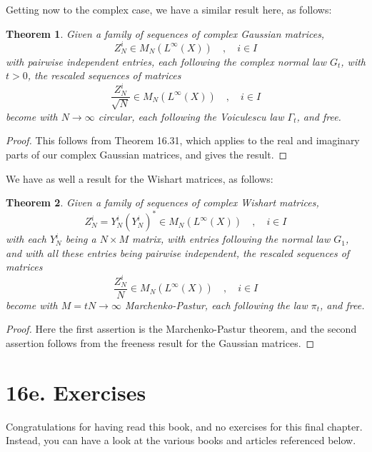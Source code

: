 \documentclass[12pt]{amsbook}
\newtheorem{theorem}{Theorem}[chapter]
\begin{document}
Getting now to the complex case, we have a similar result here, as follows:


\begin{theorem}
Given a family of sequences of complex Gaussian matrices, 
$$Z^i_N\in M_N(L^\infty(X))\quad,\quad i\in I$$
with pairwise independent entries, each following the complex normal law $G_t$, with $t>0$, the rescaled sequences of matrices
$$\frac{Z^i_N}{\sqrt{N}}\in M_N(L^\infty(X))\quad,\quad i\in I$$
become with $N\to\infty$ circular, each following the Voiculescu law $\Gamma_t$, and free.
\end{theorem}

\begin{proof}
This follows from Theorem 16.31, which applies to the real and imaginary parts of our complex Gaussian matrices, and gives the result.
\end{proof}

We have as well a result for the Wishart matrices, as follows:

\begin{theorem}
Given a family of sequences of complex Wishart matrices, 
$$Z^i_N=Y^i_N(Y^i_N)^*\in M_N(L^\infty(X))\quad,\quad i\in I$$
with each $Y^i_N$ being a $N\times M$ matrix, with entries following the normal law $G_1$, and with all these entries being pairwise independent, the rescaled sequences of matrices
$$\frac{Z^i_N}{N}\in M_N(L^\infty(X))\quad,\quad i\in I$$
become with $M=tN\to\infty$ Marchenko-Pastur, each following the law $\pi_t$, and free.
\end{theorem}

\begin{proof}
Here the first assertion is the Marchenko-Pastur theorem, and the second assertion follows from the freeness result for the Gaussian matrices.
\end{proof}

\section*{16e. Exercises}

Congratulations for having read this book, and no exercises for this final chapter. Instead, you can have a look at the various books and articles referenced below.
\end{document}
